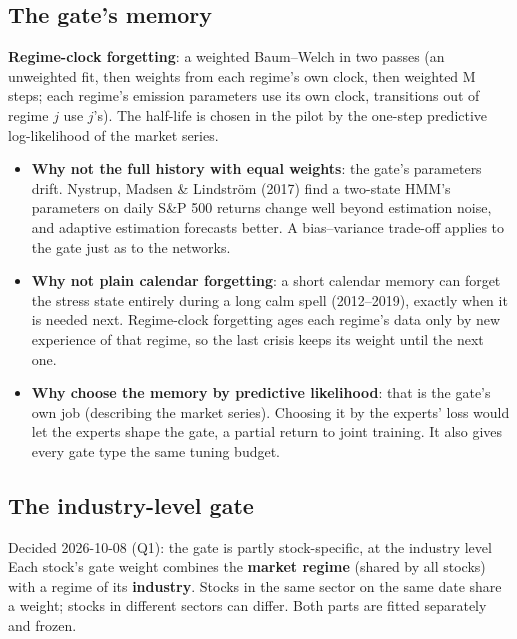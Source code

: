 \subsection{The gate's memory}

 \textbf{Regime-clock forgetting}: a weighted Baum--Welch in two passes (an
unweighted fit, then weights from each regime's own clock, then weighted M steps; each regime's emission
parameters use its own clock, transitions out of regime $j$ use $j$'s). The half-life is chosen in the pilot
by the one-step predictive log-likelihood of the market series.

\begin{whybox}
\begin{itemize}
\item \textbf{Why not the full history with equal weights}: the gate's parameters drift. Nystrup, Madsen \&
  Lindstr\"om (2017) find a two-state HMM's parameters on daily S\&P 500 returns change well beyond
  estimation noise, and adaptive estimation forecasts better. A bias--variance trade-off applies to the
  gate just as to the networks.
\item \textbf{Why not plain calendar forgetting}: a short calendar memory can forget the stress state entirely
  during a long calm spell (2012--2019), exactly when it is needed next. Regime-clock forgetting ages each
  regime's data only by new experience of that regime, so the last crisis keeps its weight until the
  next one.
\item \textbf{Why choose the memory by predictive likelihood}: that is the gate's own job (describing the
  market series). Choosing it by the experts' loss would let the experts shape the gate, a partial return to
  joint training. It also gives every gate type the same tuning budget.
\end{itemize}
\end{whybox}

\subsection{The industry-level gate}
\label{sec:industrygate}

\begin{decbox}{Decided 2026-10-08 (Q1): the gate is partly stock-specific, at the industry level}
Each stock's gate weight combines the \textbf{market regime} (shared by all stocks) with a regime of its
\textbf{industry}. Stocks in the same sector on the same date share a weight; stocks in different sectors
can differ. Both parts are fitted separately and frozen.
\end{decbox}

